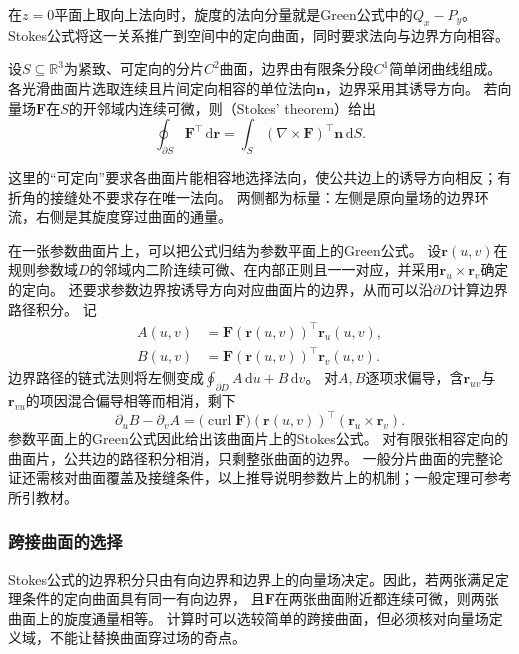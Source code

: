 在$z=0$平面上取向上法向时，旋度的法向分量就是Green公式中的$Q_x-P_y$。
Stokes公式将这一关系推广到空间中的定向曲面，同时要求法向与边界方向相容。
\begin{theorem}[Stokes定理]
\label{thm:multivariable-stokes}
设$S\subseteq\mathbb R^3$为紧致、可定向的分片$C^2$曲面，边界由有限条分段$C^1$简单闭曲线组成。
各光滑曲面片选取连续且片间定向相容的单位法向$\bm n$，边界采用其诱导方向。
若向量场$\bm F$在$S$的开邻域内连续可微，则（Stokes' theorem）给出
\begin{equation}
 \oint_{\partial S}\bm F^\top\,\mathrm d\bm r
 =\int_S(\nabla\times\bm F)^\top\bm n\,\mathrm dS.
 \label{eq:multivariable-stokes}
\end{equation}
\end{theorem}
这里的“可定向”要求各曲面片能相容地选择法向，使公共边上的诱导方向相反；有折角的接缝处不要求存在唯一法向。
两侧都为标量：左侧是原向量场的边界环流，右侧是其旋度穿过曲面的通量。

在一张参数曲面片上，可以把公式归结为参数平面上的Green公式。
设$\bm r(u,v)$在规则参数域$D$的邻域内二阶连续可微、在内部正则且一一对应，并采用$\bm r_u\times\bm r_v$确定的定向。
还要求参数边界按诱导方向对应曲面片的边界，从而可以沿$\partial D$计算边界路径积分。
记
\[
 \begin{aligned}
 A(u,v)&=\bm F(\bm r(u,v))^\top\bm r_u(u,v),\\
 B(u,v)&=\bm F(\bm r(u,v))^\top\bm r_v(u,v).
 \end{aligned}
\]
边界路径的链式法则将左侧变成$\oint_{\partial D}A\,\mathrm du+B\,\mathrm dv$。
对$A,B$逐项求偏导，含$\bm r_{uv}$与$\bm r_{vu}$的项因混合偏导相等而相消，剩下
\[
 \partial_uB-\partial_vA
 =\bigl(\operatorname{curl}\bm F\bigr)(\bm r(u,v))^\top
   (\bm r_u\times\bm r_v).
\]
参数平面上的Green公式因此给出该曲面片上的Stokes公式。
对有限张相容定向的曲面片，公共边的路径积分相消，只剩整张曲面的边界。
一般分片曲面的完整论证还需核对曲面覆盖及接缝条件，以上推导说明参数片上的机制；一般定理可参考所引教材。

\subsubsection{跨接曲面的选择}

Stokes公式的边界积分只由有向边界和边界上的向量场决定。因此，若两张满足定理条件的定向曲面具有同一有向边界，
且$\bm F$在两张曲面附近都连续可微，则两张曲面上的旋度通量相等。
计算时可以选较简单的跨接曲面，但必须核对向量场定义域，不能让替换曲面穿过场的奇点。

